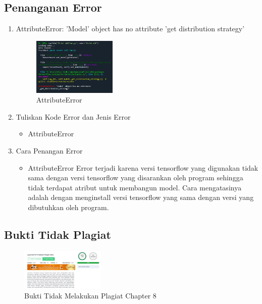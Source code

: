 \subsection{Penanganan Error}
\begin{enumerate}
	\item AttributeError: 'Model' object has no attribute 'get distribution strategy'
	\begin{figure}[H]
		\includegraphics[width=4cm]{figures/1174096/tugas8/error.PNG}
		\centering
		\caption{AttributeError}
	\end{figure}
	\item Tuliskan Kode Error dan Jenis Error
	\begin{itemize}
		\item AttributeError
	\end{itemize}
	\item Cara Penangan Error
	\begin{itemize}
		\item AttributeError
		\hfill\break
		Error terjadi karena versi tensorflow yang digunakan tidak sama dengan versi tensorflow yang disarankan oleh program sehingga tidak terdapat atribut untuk membangun model. Cara mengatasinya adalah dengan menginstall versi tensorflow yang sama dengan versi yang dibutuhkan oleh program. 
	\end{itemize}
\end{enumerate}

\subsection{Bukti Tidak Plagiat}
\begin{figure}[H]
\centering
	\includegraphics[width=4cm]{figures/1174096/tugas8/plagiarisme.PNG}
	\caption{Bukti Tidak Melakukan Plagiat Chapter 8}
\end{figure}
